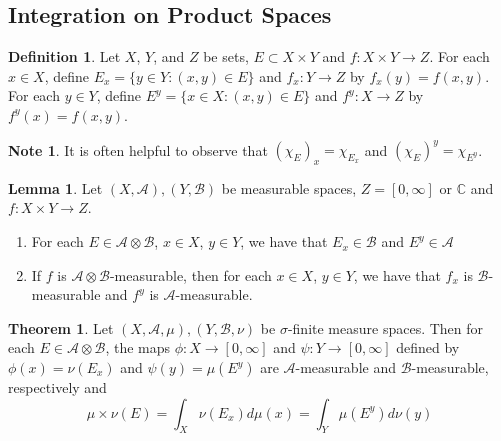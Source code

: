 \documentclass[12pt]{amsart}
\theoremstyle{definition}
\newtheorem{defn}[definition]{Definition}
\newtheorem{note}[definition]{Note}
\newtheorem{thm}[definition]{Theorem}
\newtheorem{lem}[definition]{Lemma}
\newcommand{\sig}{\sigma}
\newcommand{\C}{\mathbb{C}}
\newcommand{\MA}{\mathcal{A}}
\newcommand{\MB}{\mathcal{B}}
\newcommand{\RG}{[0,\infty]}
\newcommand{\ld}[1]{\label{defn:#1}}
\begin{document}
	
	
	
	
	
	
	
	
	
	\newpage
	\subsection{Integration on Product Spaces}
	
	\begin{defn} \ld{00000} 
		Let $X$, $Y$, and $Z$ be sets, $E \subset X \times Y$ and $f :X \times Y \rightarrow Z$. For each $x \in X$, define $E_x = \{y \in Y: (x,y) \in E\}$ and $f_x:Y \rightarrow Z$ by $f_x(y) = f(x,y)$. For each $y \in Y$, define $E^y = \{x \in X: (x,y) \in E\}$ and $f^y:X \rightarrow Z$ by $f^y(x) = f(x,y)$. 
	\end{defn}
	
	\begin{note}
		It is often helpful to observe that $(\chi_E)_x = \chi_{E_x}$ and $(\chi_E)^y = \chi_{E^y}$.
	\end{note}
	
	\begin{lem}
		Let $(X,\MA), (Y, \MB)$ be measurable spaces, $Z = \RG$ or $\C$ and $f:X\times Y \rightarrow Z$. 
		\begin{enumerate}
			\item For each $E \in \MA \otimes \MB$, $x \in X$, $y \in Y$, we have that $E_x \in \MB$ and $E^y \in \MA$
			\item If $f$ is  $\MA \otimes \MB$-measurable, then for each $x \in X$, $y \in Y$, we have that $f_x$ is $\MB$-measurable and $f^y$ is $\MA$-measurable.   
		\end{enumerate}
	\end{lem}
	
	\begin{thm}
		Let $(X,\MA, \mu), (Y, \MB, \nu)$ be $\sig$-finite measure spaces. Then for each $E \in \MA \otimes \MB$, the maps $\phi:X \rightarrow \RG$ and $\psi: Y \rightarrow \RG$ defined by $\phi(x) = \nu(E_x)$ and $\psi(y) = \mu(E^y)$ are $\MA$-measurable and $\MB$-measurable, respectively and $$\mu \times \nu(E) = \int_X \nu(E_x)d\mu(x) = \int_Y \mu(E^y)d\nu(y)$$ 
	\end{thm}
	
\end{document}
